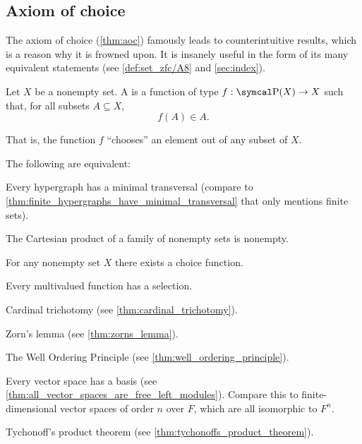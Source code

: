 \subsection{Axiom of choice}\label{subsec:axiom_of_choice}

\begin{remark}\label{remark:aoc}
  The axiom of choice (\cref{thm:aoc}) famously leads to counterintuitive results, which is a reason why it is frowned upon. It is insanely useful in the form of its many equivalent statements (see \cref{def:set_zfc/A8} and \cref{sec:index}).
\end{remark}

\begin{definition}\label{def:choice_function}
  Let \( X \) be a nonempty set. A  is a function of type \( f: \Power(X) \to X \) such that, for all subsets \( A \subseteq X \),
  \begin{equation*}
    f(A) \in A.
  \end{equation*}

  That is, the function \( f \) \enquote{chooses} an element out of any subset of \( X \).
\end{definition}

\begin{theorem}\label{thm:aoc}
  The following are equivalent:

  \begin{thmenum}
    \cite[theorem 6M(4)]{Enderton1977} Every hypergraph has a minimal transversal (compare to \cref{thm:finite_hypergraphs_have_minimal_transversal} that only mentions finite sets).

    \cite[theorem 6M(2)]{Enderton1977} The Cartesian product of a family of nonempty sets is nonempty.

    \cite[theorem 6M(3)]{Enderton1977} For any nonempty set \( X \) there exists a choice function.

    \cite[theorem 6M(1)]{Enderton1977} Every multivalued function has a selection.

     Cardinal trichotomy (see \cref{thm:cardinal_trichotomy}).

     Zorn's lemma (see \cref{thm:zorns_lemma}).

     The Well Ordering Principle (see \cref{thm:well_ordering_principle}).

     Every vector space has a basis (see \cref{thm:all_vector_spaces_are_free_left_modules}). Compare this to finite-dimensional vector spaces of order \( n \) over \( F \), which are all isomorphic to \( F^n \).

     Tychonoff's product theorem (see \cref{thm:tychonoffs_product_theorem}).
  \end{thmenum}
\end{theorem}
